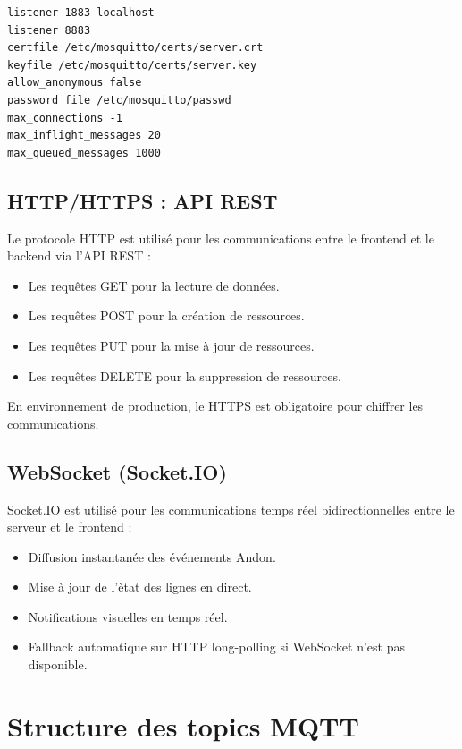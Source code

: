 \begin{lstlisting}[caption={Configuration du broker Mosquitto},label={lst:mosquitto_config}]
listener 1883 localhost
listener 8883
certfile /etc/mosquitto/certs/server.crt
keyfile /etc/mosquitto/certs/server.key
allow_anonymous false
password_file /etc/mosquitto/passwd
max_connections -1
max_inflight_messages 20
max_queued_messages 1000
\end{lstlisting}

\subsection{HTTP/HTTPS : API REST}

Le protocole HTTP est utilis\'e pour les communications entre le frontend et le backend via l'API REST :

\begin{itemize}
    \item Les requ\^etes GET pour la lecture de donn\'ees.
    \item Les requ\^etes POST pour la cr\'eation de ressources.
    \item Les requ\^etes PUT pour la mise \`a jour de ressources.
    \item Les requ\^etes DELETE pour la suppression de ressources.
\end{itemize}

En environnement de production, le HTTPS est obligatoire pour chiffrer les communications.

\subsection{WebSocket (Socket.IO)}

Socket.IO est utilis\'e pour les communications temps r\'eel bidirectionnelles entre le serveur et le frontend :

\begin{itemize}
    \item Diffusion instantan\'ee des \'ev\'enements Andon.
    \item Mise \`a jour de l'\`etat des lignes en direct.
    \item Notifications visuelles en temps r\'eel.
    \item Fallback automatique sur HTTP long-polling si WebSocket n'est pas disponible.
\end{itemize}

\section{Structure des topics MQTT}

